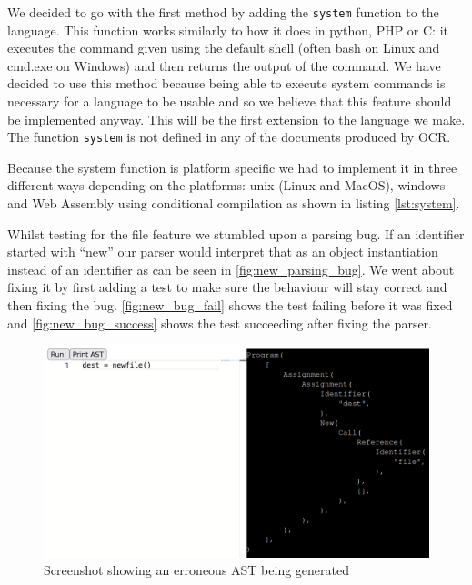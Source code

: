 \documentclass{article}
\begin{document}
We decided to go with the first method by adding the \texttt{system} function
to the language. This function works similarly to how it does in python, PHP or
C: it executes the command given using the default shell (often bash on Linux
and cmd.exe on Windows) and then returns the output of the command. We have
decided to use this method because being able to execute system commands is
necessary for a language to be usable and so we believe that this feature
should be implemented anyway. This will be the first extension to the language
we make. The function \texttt{system} is not defined in any of the documents
produced by OCR.

Because the system function is platform specific we had to implement it in
three different ways depending on the platforms: unix (Linux and MacOS),
windows and Web Assembly using conditional compilation as shown in listing
\ref{lst:system}.

Whilst testing for the file feature we stumbled upon a parsing bug. If an
identifier started with ``new'' our parser would interpret that as an object
instantiation instead of an identifier as can be seen in
\autoref{fig:new_parsing_bug}. We went about fixing it by first adding a test
to make sure the behaviour will stay correct and then fixing the bug.
\autoref{fig:new_bug_fail} shows the test failing before it was fixed and
\autoref{fig:new_bug_success} shows the test succeeding after fixing the
parser.

\begin{figure}
	\includegraphics[width=\textwidth]{new_parsing_bug}
	\caption{Screenshot showing an erroneous AST being generated}
	\label{fig:new_parsing_bug}
\end{figure}
\end{document}
